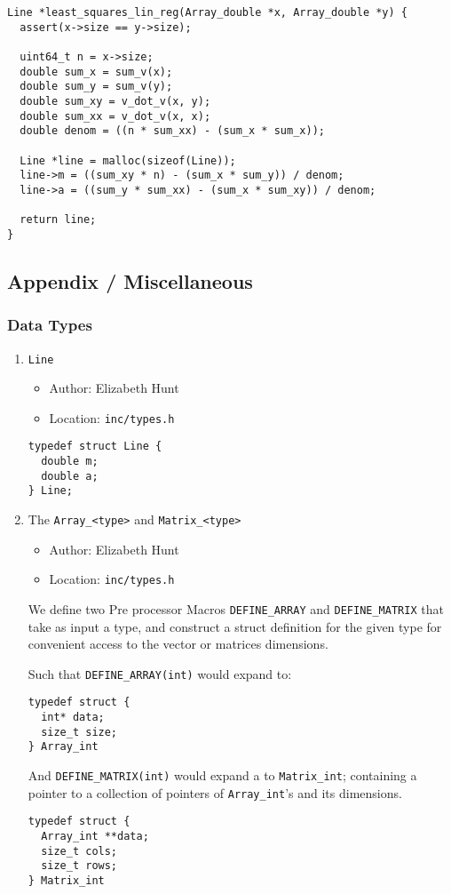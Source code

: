 \documentclass[11pt]{article}
\begin{document}
\begin{verbatim}
Line *least_squares_lin_reg(Array_double *x, Array_double *y) {
  assert(x->size == y->size);

  uint64_t n = x->size;
  double sum_x = sum_v(x);
  double sum_y = sum_v(y);
  double sum_xy = v_dot_v(x, y);
  double sum_xx = v_dot_v(x, x);
  double denom = ((n * sum_xx) - (sum_x * sum_x));

  Line *line = malloc(sizeof(Line));
  line->m = ((sum_xy * n) - (sum_x * sum_y)) / denom;
  line->a = ((sum_y * sum_xx) - (sum_x * sum_xy)) / denom;

  return line;
}
\end{verbatim}
\subsection{Appendix / Miscellaneous}
\label{sec:org85d2eae}
\subsubsection{Data Types}
\label{sec:org198ca2d}
\begin{enumerate}
\item \texttt{Line}
\label{sec:org1866885}
\begin{itemize}
\item Author: Elizabeth Hunt
\item Location: \texttt{inc/types.h}
\end{itemize}

\begin{verbatim}
typedef struct Line {
  double m;
  double a;
} Line;
\end{verbatim}
\item The \texttt{Array\_<type>} and \texttt{Matrix\_<type>}
\label{sec:org4a1c956}
\begin{itemize}
\item Author: Elizabeth Hunt
\item Location: \texttt{inc/types.h}
\end{itemize}

We define two Pre processor Macros \texttt{DEFINE\_ARRAY} and \texttt{DEFINE\_MATRIX} that take
as input a type, and construct a struct definition for the given type for
convenient access to the vector or matrices dimensions.

Such that \texttt{DEFINE\_ARRAY(int)} would expand to:

\begin{verbatim}
typedef struct {
  int* data;
  size_t size;
} Array_int
\end{verbatim}

And \texttt{DEFINE\_MATRIX(int)} would expand a to \texttt{Matrix\_int}; containing a pointer to
a collection of pointers of \texttt{Array\_int}'s and its dimensions.

\begin{verbatim}
typedef struct {
  Array_int **data;
  size_t cols;
  size_t rows;
} Matrix_int
\end{verbatim}
\end{enumerate}
\end{document}
